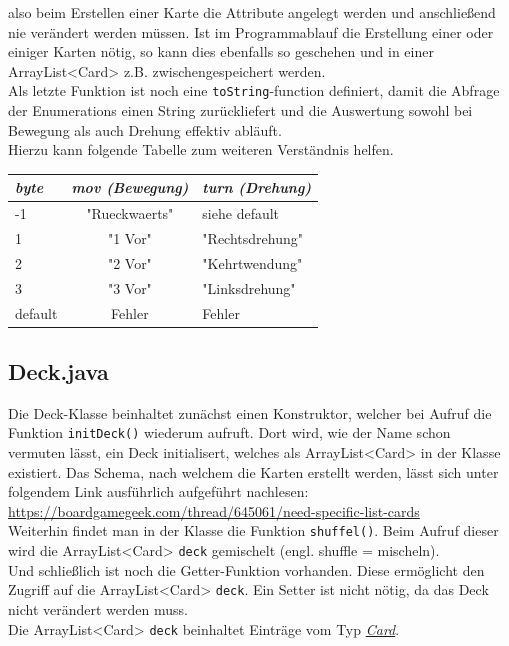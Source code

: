 \documentclass[12pt,a4paper,oneside]{book}
\theoremstyle{plain}
\numberwithin{equation}{chapter} \DeclareMathOperator{\Var}{Var}
\begin{document}
    also beim Erstellen einer Karte die Attribute angelegt werden und anschließend nie verändert werden müssen. Ist im Programmablauf die Erstellung einer oder einiger Karten nötig, so kann dies ebenfalls so geschehen und in einer ArrayList<Card> z.B. zwischengespeichert werden.\\
    Als letzte Funktion ist noch eine \texttt{toString}-function definiert, damit die Abfrage der Enumerations einen String zurückliefert und die Auswertung sowohl bei Bewegung als auch Drehung effektiv abläuft.\\
    Hierzu kann folgende Tabelle zum weiteren Verständnis helfen.
    \begin{center} \begin{longtable}{|l|c|l|}
    \hline
    \textit{byte}   & \textit{mov (Bewegung)}           & \textit{turn (Drehung)} \\ \hline
    -1              & "Rueckwaerts"                     & siehe default\\ \hline
    1               & "1 Vor"                           & "Rechtsdrehung"\\\hline
    2               & "2 Vor"                           & "Kehrtwendung"\\\hline
    3               & "3 Vor"                           & "Linksdrehung"\\\hline
    default         & Fehler                            & Fehler\\\hline
    \end{longtable} \end{center}

\subsection{Deck.java}
    Die Deck-Klasse beinhaltet zunächst einen Konstruktor, welcher bei Aufruf die Funktion \texttt{initDeck()} wiederum aufruft. Dort wird, wie der Name schon vermuten lässt, ein Deck initialisert, welches als ArrayList<Card> in der Klasse existiert. Das Schema, nach welchem die Karten erstellt werden, lässt sich unter folgendem Link ausführlich aufgeführt nachlesen:\\
    \hypertarget{cardpriorityLink}{\url{https://boardgamegeek.com/thread/645061/need-specific-list-cards}}\\
    Weiterhin findet man in der Klasse die Funktion \texttt{shuffel()}. Beim Aufruf dieser wird die ArrayList<Card> \texttt{deck} gemischelt (engl. shuffle = mischeln).\\
    Und schließlich ist noch die Getter-Funktion vorhanden. Diese ermöglicht den Zugriff auf die ArrayList<Card> \texttt{deck}. Ein Setter ist nicht nötig, da das Deck nicht verändert werden muss.\\
    Die ArrayList<Card> \texttt{deck} beinhaltet Einträge vom Typ \hyperlink{Card.java}{\textit{Card}}.
  
\end{document}
